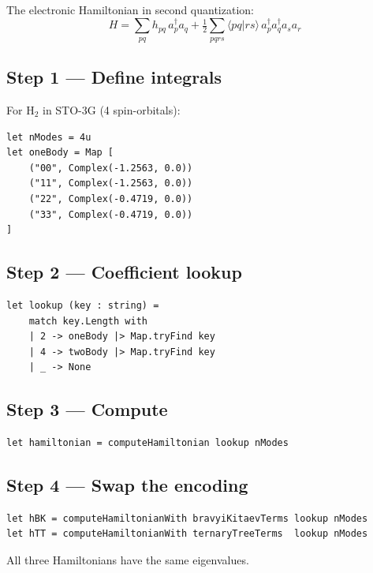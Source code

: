 \documentclass[10pt,a4paper]{article}
\begin{document}
The electronic Hamiltonian in second quantization:
%
\begin{equation}
H = \sum_{pq} h_{pq}\, a^\dagger_p a_q
  + \tfrac{1}{2} \sum_{pqrs} \langle pq|rs\rangle\,
    a^\dagger_p a^\dagger_q a_s a_r
\end{equation}

\subsection{Step 1 --- Define integrals}

For H$_2$ in STO-3G (4 spin-orbitals):

\begin{lstlisting}
let nModes = 4u
let oneBody = Map [
    ("00", Complex(-1.2563, 0.0))
    ("11", Complex(-1.2563, 0.0))
    ("22", Complex(-0.4719, 0.0))
    ("33", Complex(-0.4719, 0.0))
]
\end{lstlisting}

\subsection{Step 2 --- Coefficient lookup}

\begin{lstlisting}
let lookup (key : string) =
    match key.Length with
    | 2 -> oneBody |> Map.tryFind key
    | 4 -> twoBody |> Map.tryFind key
    | _ -> None
\end{lstlisting}

\subsection{Step 3 --- Compute}

\begin{lstlisting}
let hamiltonian = computeHamiltonian lookup nModes
\end{lstlisting}

\subsection{Step 4 --- Swap the encoding}

\begin{lstlisting}
let hBK = computeHamiltonianWith bravyiKitaevTerms lookup nModes
let hTT = computeHamiltonianWith ternaryTreeTerms  lookup nModes
\end{lstlisting}

All three Hamiltonians have the same eigenvalues.


\end{document}
